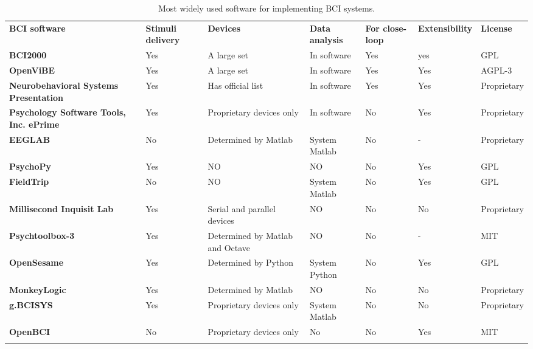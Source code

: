 
\begin{table}
\begin{centering}
\begin{tabular}{>{\raggedright}m{2cm}>{\centering}m{1.3cm}>{\centering}m{2cm}>{\centering}m{1.8cm}>{\centering}m{1.5cm}>{\centering}m{1.5cm}>{\centering}m{1.5cm}}
\toprule 
\addlinespace[1em]
\textbf{BCI software} & \textbf{Stimuli delivery} & \textbf{Devices} & \textbf{Data analysis} & \textbf{For close-loop} & \textbf{Extensibility} & \textbf{License}\tabularnewline\addlinespace[1em]
\midrule
\addlinespace[1em]
\textbf{BCI2000} & Yes & A large set & In software & Yes & yes & GPL\tabularnewline
\addlinespace[0.5cm]
\textbf{OpenViBE} & Yes & A large set & In software & Yes & Yes & AGPL-3\tabularnewline
\addlinespace[0.5cm]
\textbf{Neurobehavioral Systems Presentation} & Yes & Has official list & In software & Yes & Yes & Proprietary\tabularnewline
\addlinespace[0.5cm]
\textbf{Psychology Software Tools, Inc. ePrime} & Yes & Proprietary devices only & In software & No & Yes & Proprietary\tabularnewline
\addlinespace[0.5cm]
\textbf{EEGLAB} & No & Determined by Matlab & System Matlab & No & - & Proprietary\tabularnewline
\addlinespace[0.5cm]
\textbf{PsychoPy} & Yes & NO & NO & No & Yes & GPL\tabularnewline
\addlinespace[0.5cm]
\textbf{FieldTrip} & No & NO & System Matlab & No & Yes & GPL\tabularnewline
\addlinespace[0.5cm]
\textbf{Millisecond Inquisit Lab} & Yes & Serial and parallel devices & NO & No & No & Proprietary\tabularnewline
\addlinespace[0.5cm]
\textbf{Psychtoolbox-3} & Yes & Determined by Matlab and Octave & NO & No & - & MIT\tabularnewline
\addlinespace[0.5cm]
\textbf{OpenSesame} & Yes & Determined by Python & System Python & No & Yes & GPL\tabularnewline
\addlinespace[0.5cm]
\textbf{MonkeyLogic} & Yes & Determined by Matlab & NO & No & No & Proprietary\tabularnewline
\addlinespace[0.5cm]
\textbf{g.BCISYS} & Yes & Proprietary devices only & System Matlab & No & No & Proprietary\tabularnewline
\addlinespace[0.5cm]
\textbf{OpenBCI} & No & Proprietary devices only & No & No & Yes & MIT\tabularnewline\addlinespace[1em]
\bottomrule
\addlinespace[0.5cm]
\end{tabular}
\par\end{centering}
\caption{Most widely used software for implementing BCI systems.\label{table:bci_software}}
\end{table}


